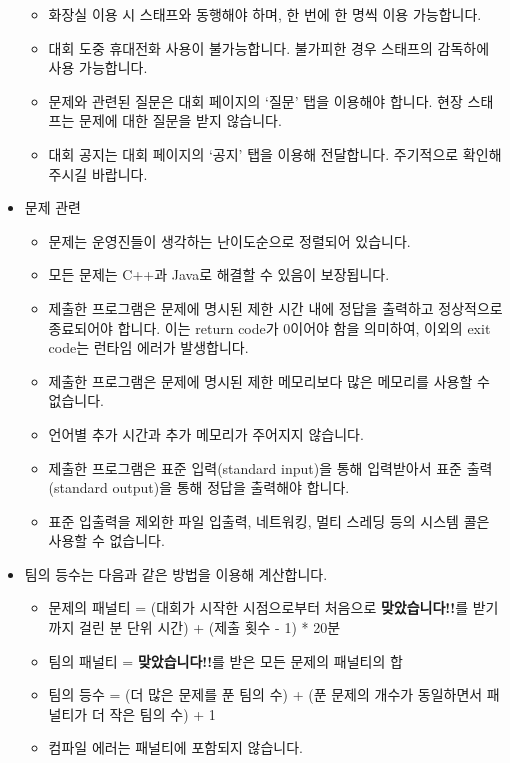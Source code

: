 \begin{itemize}[noitemsep]
\begin{itemize}[noitemsep]
        \item 화장실 이용 시 스태프와 동행해야 하며, 한 번에 한 명씩 이용 가능합니다.
        \item 대회 도중 휴대전화 사용이 불가능합니다. 불가피한 경우 스태프의 감독하에 사용 가능합니다.
        \item 문제와 관련된 질문은 대회 페이지의 `질문' 탭을 이용해야 합니다. 현장 스태프는 문제에 대한 질문을 받지 않습니다.
        \item 대회 공지는 대회 페이지의 `공지' 탭을 이용해 전달합니다. 주기적으로 확인해 주시길 바랍니다.
    \end{itemize}

    \item 문제 관련

    \begin{itemize}[noitemsep]
        \item 문제는 운영진들이 생각하는 난이도순으로 정렬되어 있습니다.
        \item 모든 문제는 C++과 Java로 해결할 수 있음이 보장됩니다.
        \item 제출한 프로그램은 문제에 명시된 제한 시간 내에 정답을 출력하고 정상적으로 종료되어야 합니다. 이는 return code가 0이어야 함을 의미하여, 이외의 exit code는 런타임 에러가 발생합니다.
        \item 제출한 프로그램은 문제에 명시된 제한 메모리보다 많은 메모리를 사용할 수 없습니다.
        \item 언어별 추가 시간과 추가 메모리가 주어지지 않습니다.
        \item 제출한 프로그램은 표준 입력(standard input)을 통해 입력받아서 표준 출력(standard output)을 통해 정답을 출력해야 합니다.
        \item 표준 입출력을 제외한 파일 입출력, 네트워킹, 멀티 스레딩 등의 시스템 콜은 사용할 수 없습니다.
    \end{itemize}

    \item 팀의 등수는 다음과 같은 방법을 이용해 계산합니다.

    \begin{itemize}[noitemsep]
        \item 문제의 패널티 = (대회가 시작한 시점으로부터 처음으로 \textbf{\textcolor{acgreen}{맞았습니다!!}}를 받기까지 걸린 분 단위 시간) + (제출 횟수 - 1) * 20분
        \item 팀의 패널티 = \textbf{\textcolor{acgreen}{맞았습니다!!}}를 받은 모든 문제의 패널티의 합
        \item 팀의 등수 = (더 많은 문제를 푼 팀의 수) + (푼 문제의 개수가 동일하면서 패널티가 더 작은 팀의 수) + 1
        \item 컴파일 에러는 패널티에 포함되지 않습니다.
    \end{itemize}
\end{itemize}

